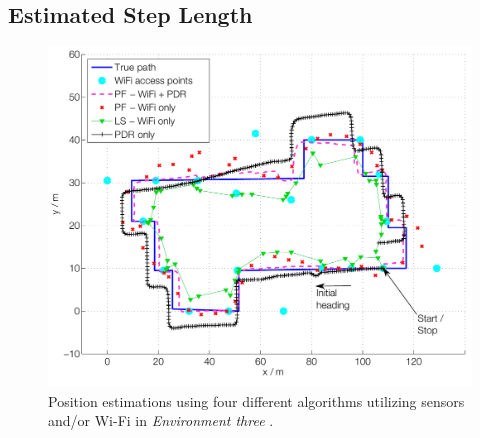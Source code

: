 \documentclass{LTHthesis}
\begin{document}
\subsection{Estimated Step Length}
%
\begin{figure}[!hbt]

\includegraphics[width=1\textwidth ]{images/sensor_fused/path_multi}
\caption{Position estimations using four different algorithms utilizing sensors and/or Wi-Fi in \emph{Environment three} .}\label{path_multi}
\end{figure}
%
\end{document}
